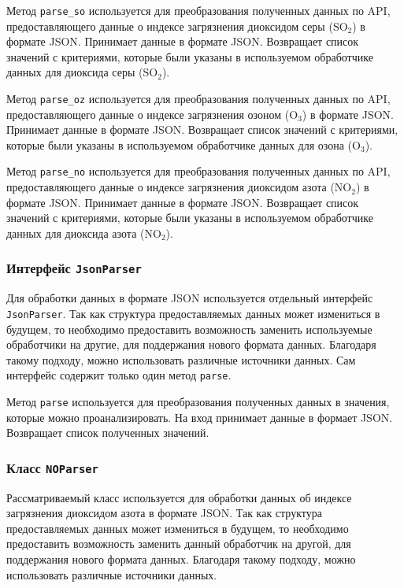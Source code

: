 Метод \texttt{parse\_so} используется для преобразования полученных данных по API, предоставляющего данные о индексе загрязнения диоксидом серы ($ \text{SO}_{\text{2}} $) в формате JSON.
Принимает данные в формате JSON.
Возвращает список значений с критериями, которые были указаны в используемом обработчике данных для диоксида серы ($ \text{SO}_{\text{2}} $).


Метод \texttt{parse\_oz} используется для преобразования полученных данных по API, предоставляющего данные о индексе загрязнения озоном ($ \text{O}_{\text{3}} $) в формате JSON.
Принимает данные в формате JSON.
Возвращает список значений с критериями, которые были указаны в используемом обработчике данных для озона ($ \text{O}_{\text{3}} $).


Метод \texttt{parse\_no} используется для преобразования полученных данных по API, предоставляющего данные о индексе загрязнения диоксидом азота ($ \text{NO}_{\text{2}} $) в формате JSON.
Принимает данные в формате JSON.
Возвращает список значений с критериями, которые были указаны в используемом обработчике данных для диоксида азота ($ \text{NO}_{\text{2}} $).


\subsubsection{Интерфейс \texttt{JsonParser}}
Для обработки данных в формате JSON используется отдельный интерфейс \texttt{JsonParser}.
Так как структура предоставляемых данных может измениться в будущем, то необходимо предоставить возможность заменить используемые обработчики на другие, для поддержания нового формата данных.
Благодаря такому подходу, можно использовать различные источники данных.
Сам интерфейс содержит только один метод \texttt{parse}.

Метод \texttt{parse} используется для преобразования полученных данных в значения, которые можно проанализировать.
На вход принимает данные в формает JSON.
Возвращает список полученных значений.


\subsubsection{Класс \texttt{NOParser}}
Рассматриваемый класс используется для обработки данных об индексе загрязнения диоксидом азота в формате JSON.
Так как структура предоставляемых данных может измениться в будущем, то необходимо предоставить возможность заменить данный обработчик на другой, для поддержания нового формата данных.
Благодаря такому подходу, можно использовать различные источники данных.

